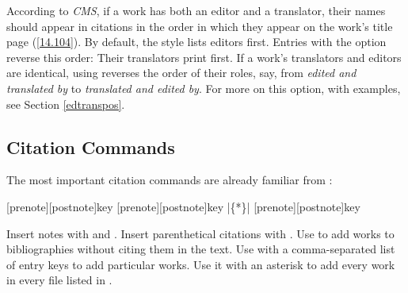 \documentclass[11pt,letterpaper,oneside]{article}
\begin{document}
\begin{optionlist}

\noindent According to \textit{CMS}, if a work has both an editor and
a translator, their names should appear in citations in the order in
which they appear on the work's title page (\ref{14.104}). By default,
the style lists editors first. Entries with the option
 reverse this order: Their translators print
first. If a work's translators and editors are identical, using
 reverses the order of their roles, say, from
\textit{edited and translated by} to \textit{translated and edited
by}. For more on this option, with examples, see Section
\ref{edtranspos}.

\end{optionlist}

\subsection{Citation Commands}
\label{citecmds}

The most important citation commands are already familiar from
\biblatex:

\begin{ltxsyntax}
[prenote][postnote]{key}
[prenote][postnote]{key}
|\{*\}|
[prenote][postnote]{key}
\end{ltxsyntax}

\noindent Insert notes with  and . Insert
parenthetical citations with . Use  to add
works to bibliographies without citing them in the text. Use
 with a comma-separated list of entry keys to add
particular works. Use it with an asterisk to add every work in every
 file listed in .
\end{document}
